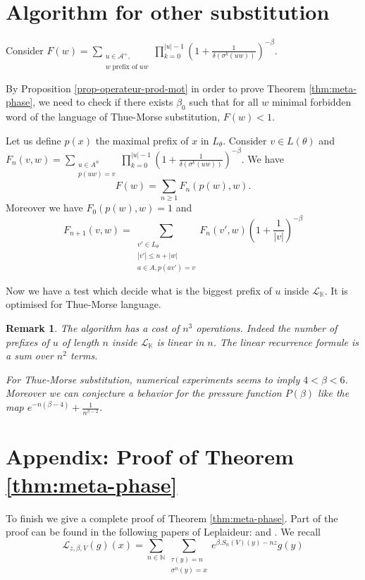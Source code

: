 \documentclass[11 pt]{article}
\newtheorem{remark}[proposition]{Remark}
\theoremstyle{definition}
\begin{document}
\section{Algorithm for other substitution}\label{sec-algo}
Consider $F(w)=\displaystyle\sum_{\substack{u\in\mathcal{A}^+,\\ w \;\text{prefix of}\; uw}}\prod_{k=0}^{|u|-1} (1+\frac{1}{\delta(\sigma^k(uw))})^{-\beta}$. 

By Proposition \ref{prop-operateur-prod-mot} in order to prove Theorem \ref{thm:meta-phase}, we need to check if there exists $\beta_0$ such that for all $w$ minimal forbidden word of the language of Thue-Morse substitution, $F(w)<1$.

Let us define $p(x)$ the maximal prefix of $x$ in $L_\theta$. 
Consider $v\in L(\theta)$ and $F_n(v,w)=\displaystyle\sum_{\substack{u\in A^n\\ p(uw)=v}}\prod_{k=0}^{|u|-1} (1+\frac{1}{\delta(\sigma^k(uw))})^{-\beta}$. 
We have $$F(w)=\sum_{n\geq 1} F_n(p(w),w).$$
Moreover we have $F_0(p(w),w)=1$ and 
$$F_{n+1}(v,w)=\sum_{\substack{v'\in L_\theta\\ |v'|\leq n+|w|\\ a\in A, p(av')=v}}F_n(v',w)(1+\frac{1}{|v|})^{-\beta}$$




Now we have a test which decide what is the biggest prefix of $u$ inside $\mathcal{L}_{\mathbb K}$. It is optimised for Thue-Morse language.





\begin{remark}
The algorithm has a cost of $n^ 3$ operations. Indeed the number of prefixes of $u$ of length $n$ inside $\mathcal{L}_{\mathbb K}$ is linear in $n$. The linear recurrence formule is a sum over $n^2$ terms.  

For Thue-Morse substitution, numerical experiments seems to imply $4<\beta<6$. Moreover we can conjecture a behavior for the pressure function $P(\beta)$ like the map $ e^{-n(\beta-4)}+\frac{1}{n^{\beta- 2}}$.
\end{remark}




\section{Appendix: Proof of Theorem \ref{thm:meta-phase}}


To finish we give a complete proof of Theorem \ref{thm:meta-phase}. Part of the proof can be found in the following papers of Leplaideur: \cite{lepl-survey} and \cite{Bruin-Leplaid-13}. We recall
$$\mathcal{L}_{z,\beta,V}(g)(x)=\displaystyle\sum_{n\in\mathbb{N}}\sum_{\substack{\tau(y)=n\\ \sigma^n(y)=x}}e^{\beta.S_n(V)(y)-nz}g(y)$$
\end{document}
